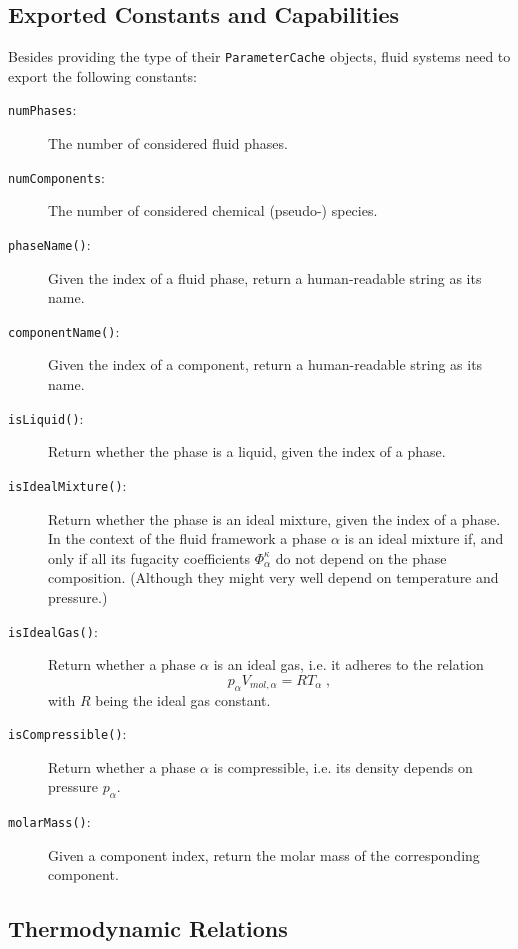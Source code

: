 \subsection{Exported Constants and Capabilities}

Besides providing the type of their \texttt{ParameterCache} objects,
fluid systems need to export the following constants:
\begin{description}
\item[\texttt{numPhases}:] The number of considered fluid phases.
\item[\texttt{numComponents}:] The number of considered chemical (pseudo-) species.
\item[\texttt{phaseName()}:] Given the index of a fluid phase, return a
  human-readable string as its name.
\item[\texttt{componentName()}:] Given the index of a component,
  return a human-readable string as its name.
\item[\texttt{isLiquid()}:] Return whether the phase is a liquid, given the index of a phase.
\item[\texttt{isIdealMixture()}:] Return whether the phase is an ideal
  mixture, given the index of a phase. In the context of the \Dumux
  fluid framework a phase $\alpha$ is an ideal mixture if, and only if
  all its fugacity coefficients $\Phi^\kappa_\alpha$ do not depend on
  the phase composition. (Although they might very well depend on
  temperature and pressure.)
\item[\texttt{isIdealGas()}:] Return whether a phase $\alpha$ is an ideal
  gas, i.e. it adheres to the relation
  \[
  p_\alpha V_{mol,\alpha} = R T_\alpha \;,
  \]
  with $R$ being the ideal gas constant.
\item[\texttt{isCompressible()}:] Return whether a phase $\alpha$ is
  compressible, i.e. its density depends on pressure $p_\alpha$.
\item[\texttt{molarMass()}:] Given a component index, return the molar
  mass of the corresponding component.
\end{description}

\subsection{Thermodynamic Relations}

